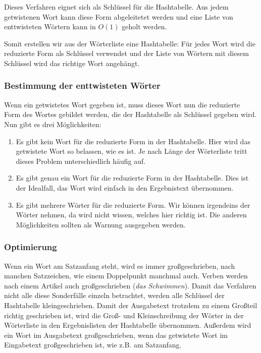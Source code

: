 \documentclass[a4paper,10pt,ngerman]{scrartcl}
\begin{document}
Dieses Verfahren eignet sich als Schlüssel für die Hashtabelle. Aus jedem getwistenen Wort kann diese Form abgeleitetet werden und eine Liste von enttwisteten Wörtern kann in $O(1)$ geholt werden.

Somit erstellen wir aus der Wörterliste eine Hashtabelle: Für jedes Wort wird die reduzierte Form als Schlüssel verwendet und der Liste von Wörtern mit diesem Schlüssel wird das richtige Wort angehängt.

\subsubsection{Bestimmung der enttwisteten Wörter}
Wenn ein getwistetes Wort gegeben ist, muss dieses Wort nun die reduzierte Form des Wortes gebildet werden, die der Hashtabelle als Schlüssel gegeben wird. Nun gibt es drei Möglichkeiten:
\begin{enumerate}
  \item Es gibt kein Wort für die reduzierte Form in der Hashtabelle. Hier wird das getwistete Wort so belassen, wie es ist. Je nach Länge der Wörterliste tritt dieses Problem unterschiedlich häufig auf.
  \item Es gibt genau ein Wort für die reduzierte Form in der Hashtabelle. Dies ist der Idealfall, das Wort wird einfach in den Ergebnistext übernommen.
  \item Es gibt mehrere Wörter für die reduzierte Form. Wir können irgendeins der Wörter nehmen, da wird nicht wissen, welches hier richtig ist. Die anderen Möglichkeiten sollten als Warnung ausgegeben werden.
\end{enumerate}

\subsubsection{Optimierung}
Wenn ein Wort am Satzanfang steht, wird es immer großgeschrieben, nach manchen Satzzeichen, wie einem Doppelpunkt manchmal auch. Verben werden nach einem Artikel auch großgeschrieben (\textit{das Schwimmen}). Damit das Verfahren nicht alle diese Sonderfälle einzeln betrachtet, werden alle Schlüssel der Hashtabelle kleingeschrieben. Damit der Ausgabetext trotzdem zu einem Großteil richtig geschrieben ist, wird die Groß- und Kleinschreibung der Wörter in der Wörterliste in den Ergebnislisten der Hashtabelle übernommen. Außerdem wird ein Wort im Ausgabetext großgeschrieben, wenn das getwistete Wort im Eingabetext großgeschrieben ist, wie z.B. am Satzanfang.
\end{document}
